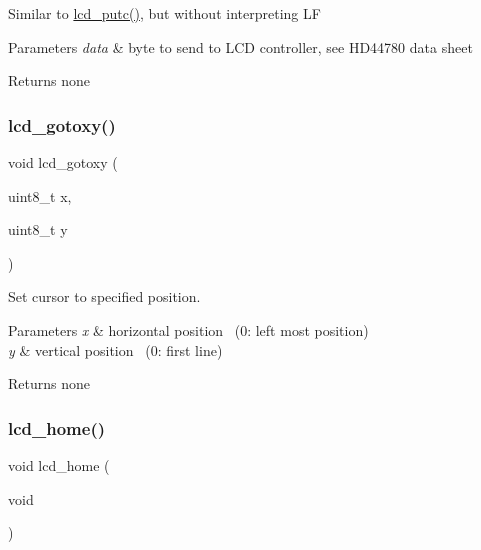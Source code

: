 Similar to \hyperlink{group__pfleury__lcd_gafa7e36b95c43d603f510273ad077cbbe}{lcd\+\_\+putc()}, but without interpreting LF 
\begin{DoxyParams}{Parameters}
{\em data} & byte to send to L\+CD controller, see H\+D44780 data sheet \\
\hline
\end{DoxyParams}
\begin{DoxyReturn}{Returns}
none 
\end{DoxyReturn}
\mbox{\label{group__pfleury__lcd_gadbf47a5efdf02367ded1ebf8f9edb5fe}} 
\subsubsection{\texorpdfstring{lcd\+\_\+gotoxy()}{lcd\_gotoxy()}}
{\footnotesize\ttfamily void lcd\+\_\+gotoxy (\begin{DoxyParamCaption}\item[{uint8\+\_\+t}]{x,  }\item[{uint8\+\_\+t}]{y }\end{DoxyParamCaption})}



Set cursor to specified position. 


\begin{DoxyParams}{Parameters}
{\em x} & horizontal position~\newline
 (0\+: left most position) \\
\hline
{\em y} & vertical position~\newline
 (0\+: first line) \\
\hline
\end{DoxyParams}
\begin{DoxyReturn}{Returns}
none 
\end{DoxyReturn}
\mbox{\label{group__pfleury__lcd_ga3aabf730aa4e0393bb5c959583c00a8e}} 
\subsubsection{\texorpdfstring{lcd\+\_\+home()}{lcd\_home()}}
{\footnotesize\ttfamily void lcd\+\_\+home (\begin{DoxyParamCaption}\item[{void}]{ }\end{DoxyParamCaption})}



